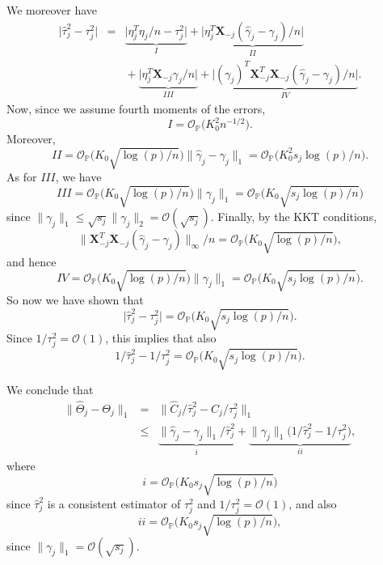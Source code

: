\documentclass[aos,MSNbibl,dvips]{arximspdf}
\newcommand{\PP}{\mathbb{P}}
\newcommand{\bx}{\mathbf{X}}
\begin{document}
We moreover have
%
\begin{eqnarray*}
\bigl| \hat\tau_j^2 - \tau_j^2\bigr| &=
&\underbrace{\bigl| \eta_j^T \eta_j / n - \tau
_j^2\bigr| }_{I} + \underbrace{\bigl|
\eta_j^T \bx_{-j} (\hat\gamma_j -
\gamma_j )/n \bigr|}_{\mathit{II}}
\\
&&{}+ \underbrace{\bigl| \eta_j^T \bx_{-j}
\gamma_j /n\bigr| }_{\mathit{III}} + \underbrace {\bigl|(
\gamma_j)^T \bx_{-j}^T
\bx_{-j} (\hat\gamma_j - \gamma_j ) / n
\bigr|}_{\mathit{IV}}.
\end{eqnarray*}
%
Now, since we assume fourth moments of the errors,
%
\[
I = {\mathcal O}_{\PP} \bigl( K_0^2
n^{-1/2} \bigr). %
\]
%
Moreover,
%
\[
\mathit{II} = {\mathcal O }_{\PP} \bigl( K_0 \sqrt{\log(p)/ n}
\bigr) \| \hat\gamma_j - \gamma_j \|_1 = {
\mathcal O }_{\PP} \bigl( K_0^2 s_j
\log(p)/ n\bigr). %
\]
%
As for $\mathit{III}$, we have
%
\[
\mathit{III}= {\mathcal O}_{\PP} \bigl( K_0 \sqrt{\log(p)/ n} \bigr)
\| \gamma_j \|_1 = {\mathcal O}_{\PP} \bigl(
K_0 \sqrt{s_j\log(p)/ n} \bigr) %
\]
%
since $\| \gamma_j \|_1 \le\sqrt{s_j} \| \gamma_j \|_2 = {\mathcal O}
( \sqrt{s_j} ) $.
Finally, by the KKT conditions,
%
\[
\bigl\| \bx_{-j}^T \bx_{-j} ( \hat
\gamma_j - \gamma_j ) \bigr\|_{\infty} /n = {\mathcal
O}_{\PP} \bigl( K_0 \sqrt{\log(p)/ n } \bigr), %
\]
%
and hence
%
\[
\mathit{IV} = {\mathcal O}_{\PP} \bigl( K_0 \sqrt{\log(p)/ n }
\bigr) \| \gamma_j \|_1 = {\mathcal O}_{\PP}
\bigl( K_0 \sqrt{s_j \log(p)/ n } \bigr). %
\]
%
So now we have shown that
%
\[
\bigl| \hat\tau_j^2 - \tau_j^2\bigr| = {
\mathcal O}_{\PP} \bigl( K_0 \sqrt{s_j \log (p)/
n } \bigr). %
\]
%
Since $1/\tau_j^2 = {\mathcal O} (1)$, this implies that also
%
\[
1 / \hat\tau_j^2 - 1 / \tau_j^2
= {\mathcal O}_{\PP} \bigl( K_0 \sqrt{s_j
\log(p)/ n } \bigr). %
\]

We conclude that
%
\begin{eqnarray*}
\|\hat\Theta_j - \Theta_j \|_1 &=&\bigl\| \hat
C_j / \hat\tau_j^2 - C_j/
\tau_j^2 \bigr\|_1 \\
&\le& \underbrace{\| \hat
\gamma_j - \gamma_j \|_1 / \hat
\tau_j^2 }_{i} %
+ \underbrace{\| \gamma_j \|_1 \bigl( 1/ \hat
\tau_j^2 - 1 / \tau_j^2
\bigr)}_{\mathit{ii}},
\end{eqnarray*}
%
where
%
\[
i = {\mathcal O}_{\PP} \bigl( K_0 s_j \sqrt{
\log(p)/ n } \bigr) %
\]
%
since $\hat\tau_j^2$ is a consistent estimator of $\tau_j^2$ and $1/
\tau_j^2 = {\mathcal O} (1) $,
and also
%
\[
\mathit{ii}= {\mathcal O}_{\PP} \bigl( K_0 s_j \sqrt{
\log(p)/ n } \bigr), %
\]
%
since $\| \gamma_j \|_1 = {\mathcal O} (\sqrt{s_j}) $.
\end{document}
